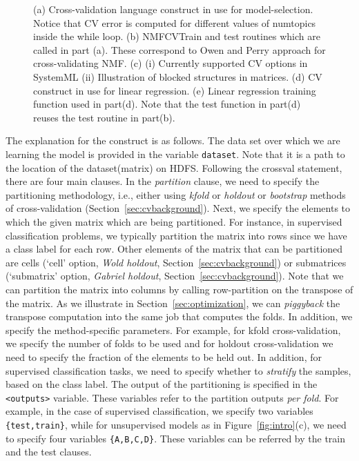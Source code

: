 \documentclass{vldb}
\begin{document}
\begin{figure}
\caption{(a) Cross-validation language construct in use for model-selection.
Notice that CV error is computed for different values of numtopics inside the
while loop. (b) NMFCVTrain and test routines which are called in part (a). These
correspond to Owen and Perry approach for cross-validating NMF.
(c) (i) Currently supported CV options in SystemML (ii) Illustration of blocked
structures in matrices. (d) CV construct in use for linear regression. (e) Linear
regression training function used in part(d). Note that the test function in
part(d) reuses the test routine in part(b).}
\label{fig:combination}
\end{figure}



The explanation for the construct is as follows. The data set over which we are
learning the model is provided in the variable {\tt dataset}. Note that it is a
path to the location of the dataset(matrix) on HDFS. Following the crossval
statement, there are four main clauses. In the {\em partition} clause, we need
to specify the partitioning methodology, i.e., either using {\em kfold} or {\em
holdout} or {\em bootstrap} methods of cross-validation
(Section~\ref{sec:cvbackground}).  Next, we specify the elements to which the
given matrix which are being partitioned. For instance, in supervised
classification problems, we typically partition the matrix into rows since we
have a class label for each row. Other elements of the matrix that can be
partitioned are cells (`cell' option, {\em Wold holdout},
Section~\ref{sec:cvbackground}) or submatrices (`submatrix' option, {\em Gabriel
holdout}, Section~\ref{sec:cvbackground}). Note that we can partition the matrix
into columns by calling row-partition on the transpose of the matrix. As we
illustrate in Section~\ref{sec:optimization}, we can {\em piggyback} the transpose
computation into the same job that computes the folds.
In addition, we specify the method-specific parameters. For example, for kfold
cross-validation, we specify the number of folds to be used and for holdout
cross-validation we need to specify the fraction of the elements to be held out.
In addition, for supervised classification tasks, we need to specify whether to
{\em stratify} the samples, based on the class label. The output of the
partitioning is specified in the {\tt <outputs>} variable. These variables refer
to the partition outputs {\em per fold}. For example, in the case of supervised
classification, we specify two variables {\tt \{test,train\}}, while for
unsupervised models as in Figure~\ref{fig:intro}(c), we need to specify four
variables {\tt \{A,B,C,D\}}.  These variables can be referred by the train and
the test clauses.
\end{document}
